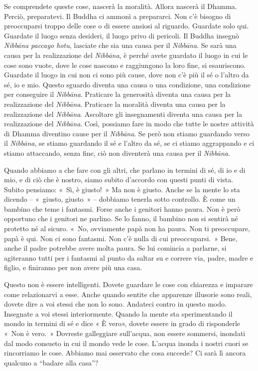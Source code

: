 Se comprendete queste cose, nascerà la moralità. Allora nascerà il
Dhamma. Perciò, preparatevi. Il Buddha ci ammonì a prepararci. Non c'è
bisogno di preoccuparsi troppo delle cose o di essere ansiosi al
riguardo. Guardate solo qui. Guardate il luogo senza desideri, il luogo
privo di pericoli. Il Buddha insegnò \emph{Nibbāna paccayo hotu},
lasciate che sia una causa per il \emph{Nibbāna}. Se sarà una causa per
la realizzazione del \emph{Nibbāna}, è perché avete guardato il luogo in
cui le cose sono vuote, dove le cose nascono e raggiungono la loro fine,
si esauriscono. Guardate il luogo in cui non ci sono più cause, dove non
c'è più il sé o l'altro da sé, io e mio. Questo sguardo diventa una
causa o una condizione, una condizione per conseguire il \emph{Nibbāna}.
Praticare la generosità diventa una causa per la realizzazione del
\emph{Nibbāna}. Praticare la moralità diventa una causa per la
realizzazione del \emph{Nibbāna}. Ascoltare gli insegnamenti diventa una
causa per la realizzazione del \emph{Nibbāna}. Così, possiamo fare in
modo che tutte le nostre attività di Dhamma diventino cause per il
\emph{Nibbāna}. Se però non stiamo guardando verso il \emph{Nibbāna}, se
stiamo guardando il sé e l'altro da sé, se ci stiamo aggrappando e ci
stiamo attaccando, senza fine, ciò non diventerà una causa per il
\emph{Nibbāna}.

Quando abbiamo a che fare con gli altri, che parlano in termini di sé,
di io e di mio, e di ciò che è nostro, siamo subito d'accordo con questi
punti di vista. Subito pensiamo: «~Sì, è giusto!~» Ma non è giusto.
Anche se la mente lo sta dicendo -- «~giusto, giusto~» -- dobbiamo
tenerla sotto controllo. È come un bambino che teme i fantasmi. Forse
anche i genitori hanno paura. Non è però opportuno che i genitori ne
parlino. Se lo fanno, il bambino non si sentirà né protetto né al
sicuro. «~No, ovviamente papà non ha paura. Non ti preoccupare, papà è
qui. Non ci sono fantasmi. Non c'è nulla di cui preoccuparsi.~» Bene,
anche il padre potrebbe avere molta paura. Se lui comincia a parlarne,
si agiteranno tutti per i fantasmi al punto da saltar su e correre via,
padre, madre e figlio, e finiranno per non avere più una casa.

Questo non è essere intelligenti. Dovete guardare le cose con chiarezza
e imparare come relazionarvi a esse. Anche quando sentite che apparenze
illusorie sono reali, dovete dire a voi stessi che non lo sono. Andateci
contro in questo modo. Insegnate a voi stessi interiormente. Quando la
mente sta sperimentando il mondo in termini di sé e dice « È vero»,
dovete essere in grado di risponderle «~Non è vero.~» Dovreste
galleggiare sull'acqua, non essere sommersi, inondati dal modo consueto
in cui il mondo vede le cose. L'acqua inonda i nostri cuori se
rincorriamo le cose. Abbiamo mai osservato che cosa succede? Ci sarà lì
ancora qualcuno a ``badare alla casa''?

